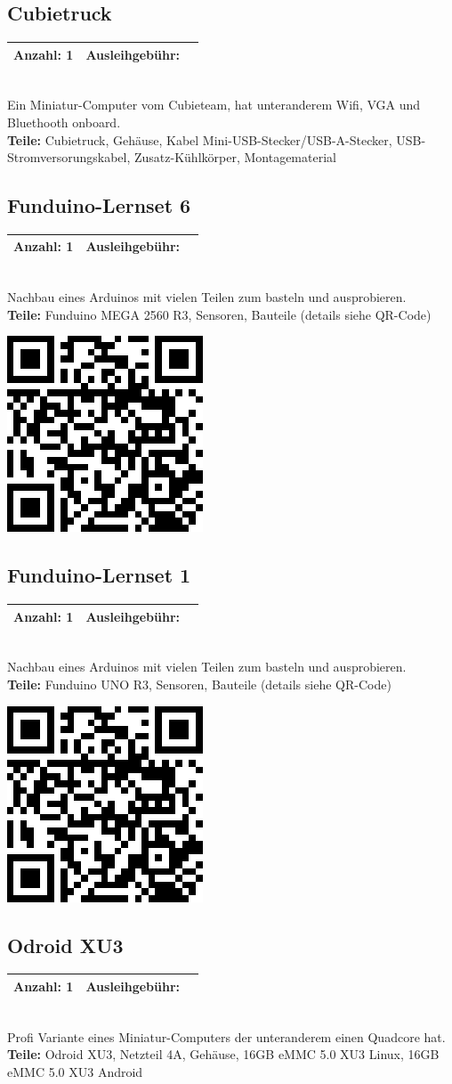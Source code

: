 \documentclass[a4paper]{article}
\newcommand{\infobox}[3] %
        {\par
                \begin{tabular}{| c | c | c| }
                \hline
                Anzahl: #1 & Ausleihgebühr: \EUR{#2}   \\
                \hline
                \end{tabular} \\
        }
\begin{document}
\subsection{Cubietruck}
\infobox{1}{0}{Neu}
Ein Miniatur-Computer vom Cubieteam, hat unteranderem Wifi, VGA und Bluethooth onboard. \\
\textbf{Teile:} Cubietruck, Gehäuse, Kabel Mini-USB-Stecker/USB-A-Stecker, USB-Stromversorungskabel, Zusatz-Kühlkörper, Montagematerial

\subsection{Funduino-Lernset 6} 
\infobox{1}{2,5}{Neu}
Nachbau eines Arduinos mit vielen Teilen zum basteln und ausprobieren.\\
\textbf{Teile:} Funduino MEGA 2560 R3, Sensoren, Bauteile (details siehe QR-Code)

\includegraphics[width=.3\textwidth]{FunduinoSet6}

\subsection{Funduino-Lernset 1} 
\infobox{1}{5}{Neu}
Nachbau eines Arduinos mit vielen Teilen zum basteln und ausprobieren.\\
\textbf{Teile:} Funduino UNO R3, Sensoren, Bauteile (details siehe QR-Code)

\includegraphics[width=.3\textwidth]{FunduinoSet6}

\subsection{Odroid XU3} 
\infobox{1}{0}{Neu}
Profi Variante eines Miniatur-Computers der unteranderem einen Quadcore hat.\\
\textbf{Teile:} Odroid XU3, Netzteil 4A, Gehäuse, 16GB eMMC 5.0 XU3 Linux, 16GB eMMC 5.0 XU3 Android
\end{document}

